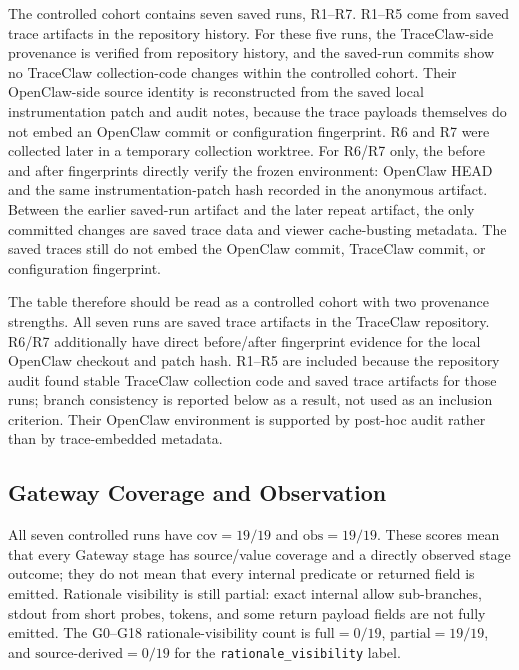\documentclass[11pt,a4paper]{article}
\begin{document}
The controlled cohort contains seven saved runs, R1--R7. R1--R5 come
from saved trace artifacts in the repository history. For these five
runs, the TraceClaw-side provenance is verified from repository history,
and the saved-run commits show no TraceClaw collection-code changes
within the controlled cohort. Their OpenClaw-side source identity is
reconstructed from the saved local instrumentation patch and audit notes,
because the trace payloads themselves do not embed an OpenClaw commit or
configuration fingerprint. R6 and R7 were collected later in a temporary
collection worktree. For R6/R7 only, the before and after fingerprints
directly verify the frozen environment: OpenClaw HEAD
 and the same
instrumentation-patch hash recorded in the anonymous artifact. Between
the earlier saved-run artifact and the later repeat artifact, the only
committed changes are saved trace data and viewer cache-busting metadata.
The saved traces still do not embed the OpenClaw commit, TraceClaw
commit, or configuration fingerprint.

The table therefore should be read as a controlled cohort with two
provenance strengths. All seven runs are saved trace artifacts in the
TraceClaw repository. R6/R7 additionally have direct before/after
fingerprint evidence for the local OpenClaw checkout and patch hash.
R1--R5 are included because the repository audit found stable TraceClaw
collection code and saved trace artifacts for those runs; branch
consistency is reported below as a result, not used as an inclusion
criterion. Their OpenClaw environment is supported by post-hoc audit
rather than by trace-embedded metadata.

\begin{table}[H]
\centering
\caption{Controlled cohort and runtime class. In the Gateway / AR column,
\textit{complete} means \(\mathrm{cov}=19/19\) and \(\mathrm{obs}=19/19\);
\textit{observed} means the AR lifecycle reaches a recorded completion
state. Tool summaries report counts rather than full event sequences.}
\label{tab:controlled-cohort}
{\scriptsize

}
\end{table}

\subsection{Gateway Coverage and Observation}

All seven controlled runs have \(\mathrm{cov}=19/19\) and
\(\mathrm{obs}=19/19\). These scores mean that every Gateway stage has
source/value coverage and a directly observed stage outcome; they do not
mean that every internal predicate or returned field is emitted.
Rationale visibility is still partial: exact internal allow
sub-branches, stdout from short probes, tokens, and some return payload
fields are not fully emitted. The G0--G18 rationale-visibility count is
\(\mathrm{full}=0/19\), \(\mathrm{partial}=19/19\), and
\(\mathrm{source\mbox{-}derived}=0/19\) for the
\texttt{rationale\_visibility} label.
\end{document}

